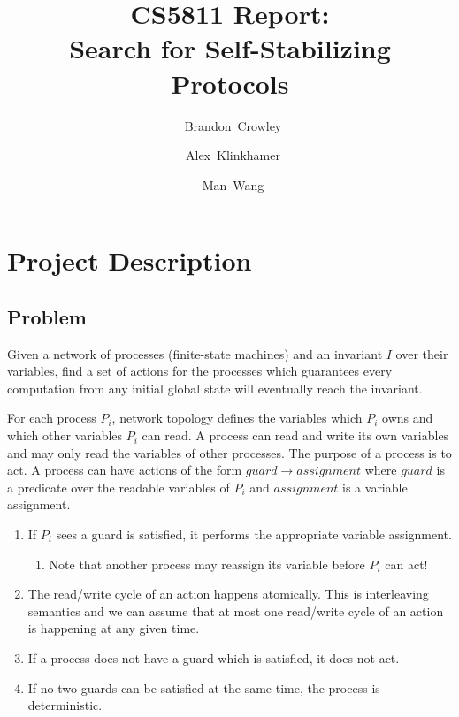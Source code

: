 


\usepackage{tikz}
\usetikzlibrary{arrows}

\usepackage{float}

\setlength{\abovedisplayskip}{0.5em}
\setlength{\abovedisplayshortskip}{0.5em}
\setlength{\belowdisplayskip}{0.5em}
\setlength{\belowdisplayshortskip}{0.5em}
\setlength{\abovecaptionskip}{0.0em}
\setlength{\belowcaptionskip}{0.0em}


\title{
 CS5811 Report:\\
 Search for Self-Stabilizing Protocols
}

\author{~Brandon~Crowley\and~Alex~Klinkhamer\and~Man~Wang}
\maketitle

\tableofcontents

\section{Project Description}

\subsection{Problem}

Given a network of processes (finite-state machines) and an invariant $I$ over their variables, find a set of actions for the processes which guarantees every computation from any initial global state will eventually reach the invariant.


For each process $P_i$, network topology defines the variables which $P_i$ owns and which other variables $P_i$ can read.
A process can read and write its own variables and may only read the variables of other processes.
The purpose of a process is to act.
A process can have actions of the form $\mathit{guard} \to \mathit{assignment}$ where $\mathit{guard}$ is a predicate over the readable variables of $P_i$ and $\mathit{assignment}$ is a variable assignment.
\begin{enumerate}
\item If $P_i$ sees a guard is satisfied, it performs the appropriate variable assignment.
 \begin{enumerate}
 \item Note that another process may reassign its variable before $P_i$ can act!
 \end{enumerate}
\item The read/write cycle of an action happens atomically. This is interleaving semantics and we can assume that at most one read/write cycle of an action is happening at any given time.
\item If a process does not have a guard which is satisfied, it does not act.
\item If no two guards can be satisfied at the same time, the process is deterministic.
\end{enumerate}

